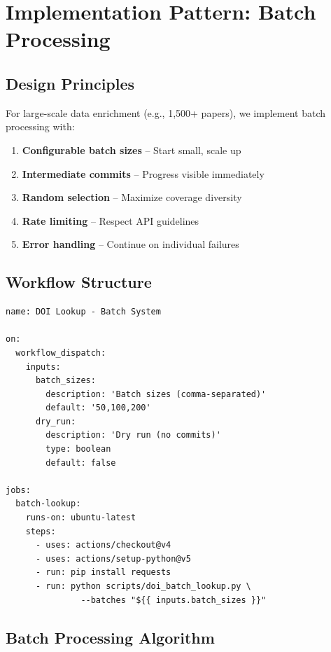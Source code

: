 \section{Implementation Pattern: Batch Processing}
\label{sec:api-batch}

\subsection{Design Principles}

For large-scale data enrichment (e.g., 1,500+ papers), we implement batch processing with:

\begin{enumerate}
    \item \textbf{Configurable batch sizes} -- Start small, scale up
    \item \textbf{Intermediate commits} -- Progress visible immediately
    \item \textbf{Random selection} -- Maximize coverage diversity
    \item \textbf{Rate limiting} -- Respect API guidelines
    \item \textbf{Error handling} -- Continue on individual failures
\end{enumerate}

\subsection{Workflow Structure}

\begin{verbatim}
name: DOI Lookup - Batch System

on:
  workflow_dispatch:
    inputs:
      batch_sizes:
        description: 'Batch sizes (comma-separated)'
        default: '50,100,200'
      dry_run:
        description: 'Dry run (no commits)'
        type: boolean
        default: false

jobs:
  batch-lookup:
    runs-on: ubuntu-latest
    steps:
      - uses: actions/checkout@v4
      - uses: actions/setup-python@v5
      - run: pip install requests
      - run: python scripts/doi_batch_lookup.py \
               --batches "${{ inputs.batch_sizes }}"
\end{verbatim}

\subsection{Batch Processing Algorithm}


